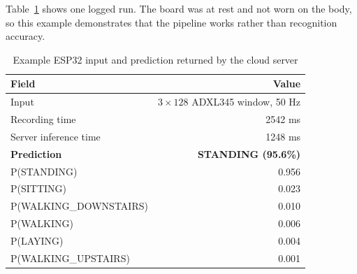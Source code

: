 Table~\ref{tab:esp32-example} shows one logged run. The board was at rest and not worn on the body, so this example demonstrates that the pipeline works rather than recognition accuracy.

\begin{table}[h]
\centering
\begin{tabular}{lr}
\toprule
Field & Value \\
\midrule
Input & $3 \times 128$ ADXL345 window, 50 Hz \\
Recording time & 2542 ms \\
Server inference time & 1248 ms \\
\textbf{Prediction} & \textbf{STANDING (95.6\%)} \\
\midrule
P(STANDING) & 0.956 \\
P(SITTING) & 0.023 \\
P(WALKING\_DOWNSTAIRS) & 0.010 \\
P(WALKING) & 0.006 \\
P(LAYING) & 0.004 \\
P(WALKING\_UPSTAIRS) & 0.001 \\
\bottomrule
\end{tabular}
\caption{Example ESP32 input and prediction returned by the cloud server}
\label{tab:esp32-example}
\end{table}

